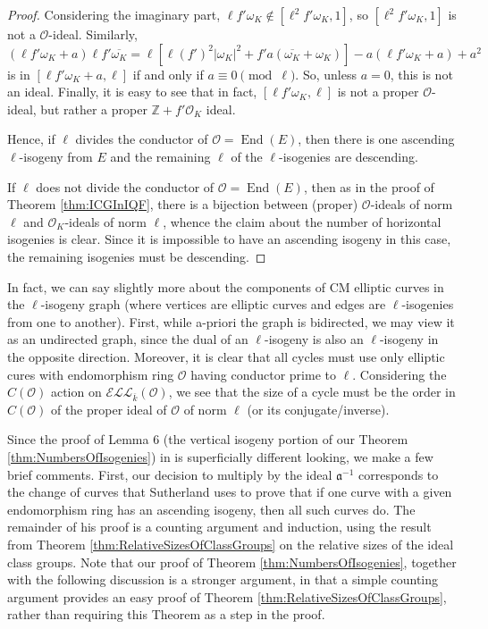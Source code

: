 \documentclass{amsart}
\theoremstyle{definition}
\theoremstyle{remark}
\numberwithin{equation}{section}
\newcommand{\cE}{\mathcal E}
\newcommand{\cL}{\mathcal L}
\newcommand{\cO}{\mathcal O}
\newcommand{\fka}{\mathfrak a}
\newcommand{\bbZ}{\mathbb Z}
\newcommand{\inv}{^{-1}}
\newcommand{\ELL}{\cE\cL\cL}
\DeclareMathOperator{\End}{End}
\begin{document}
\begin{proof}
 Considering the imaginary part, $\ell f'\omega_{K} \notin [\ell^2 f' \omega_{K}, 1]$, so $[\ell^2 f' \omega_{K}, 1]$ is not a $\cO$-ideal. Similarly, 
\[
(\ell f' \omega_{K} + a) \ell f' \overline{\omega_{K}} = \ell [\ell (f')^2 |\omega_{K}|^2 + f' a (\overline{\omega_{K}} + \omega_{K})] - a (\ell f' \omega_{K} + a) + a^2
\]
is in $[\ell f' \omega_{K} + a, \ell]$ if and only if $a \equiv 0 \pmod{\ell}$. So, unless $a = 0$, this is not an ideal. Finally, it is easy to see that in fact, $[\ell f' \omega_{K}, \ell]$ is not a proper $\cO$-ideal, but rather a proper $\bbZ + f' \cO_{K}$ ideal.

Hence, if $\ell$ divides the conductor of $\cO = \End(E)$, then there is one ascending $\ell$-isogeny from $E$ and the remaining $\ell$ of the $\ell$-isogenies are descending.

If $\ell$ does not divide the conductor of $\cO = \End(E)$, then as in the proof of Theorem \ref{thm:ICGInIQF}, there is a bijection between (proper) $\cO$-ideals of norm $\ell$ and $\cO_{K}$-ideals of norm $\ell$, whence the claim about the number of horizontal isogenies is clear. Since it is impossible to have an ascending isogeny in this case, the remaining isogenies must be descending.
\end{proof}

In fact, we can say slightly more about the components of CM elliptic curves in the $\ell$-isogeny graph (where vertices are elliptic curves and edges are $\ell$-isogenies from one to another). First, while a-priori the graph is bidirected, we may view it as an undirected graph, since the dual of an $\ell$-isogeny is also an $\ell$-isogeny in the opposite direction. Moreover, it is clear that all cycles must use only elliptic cures with endomorphism ring $\cO$ having conductor prime to $\ell$. Considering the $C(\cO)$ action on $\ELL_{\overline{k}}(\cO)$, we see that the size of a cycle must be the order in $C(\cO)$ of the  proper ideal of $\cO$ of norm $\ell$ (or its conjugate/inverse). 

Since the proof of Lemma 6 (the vertical isogeny portion of our Theorem \ref{thm:NumbersOfIsogenies}) in \cite{SutherlandIV} is superficially different looking, we make a few brief comments. First, our decision to multiply by the ideal $\fka\inv$ corresponds to the change of curves that Sutherland uses to prove that if one curve with a given endomorphism ring has an ascending isogeny, then all such curves do. The remainder of his proof is a counting argument and induction, using the result from Theorem \ref{thm:RelativeSizesOfClassGroups} on the relative sizes of the ideal class groups. Note that our proof of Theorem \ref{thm:NumbersOfIsogenies}, together with the following discussion is a stronger argument, in that a simple counting argument provides an easy proof of Theorem \ref{thm:RelativeSizesOfClassGroups}, rather than requiring this Theorem as a step in the proof.
\end{document}
